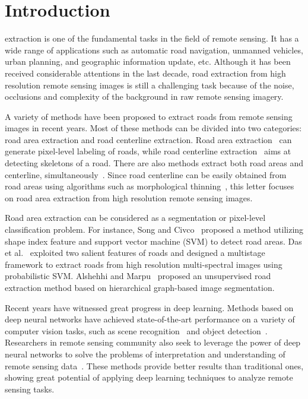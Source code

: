 \documentclass[journal]{IEEEtran}
\begin{document}
\section{Introduction}
 extraction is one of the fundamental tasks in the field of remote sensing. It has a wide range of applications such as automatic road navigation, unmanned vehicles, urban planning, and geographic information update, etc. Although it has been received considerable attentions in the last decade, road extraction from high resolution remote sensing images is still a challenging task because of the noise, occlusions and complexity of the background in raw remote sensing imagery.


A variety of methods have been proposed to extract roads from remote sensing images in recent years. Most of these methods can be divided into two categories: road area extraction and road centerline extraction. Road area  extraction~\cite{Xin2009Road,mnih2010learning,Unsalan2012Road,Cheng2015Urban,Saito2016Multiple,Alshehhi2017Hierarchical} can generate pixel-level labeling of roads, while road centerline extraction~\cite{Liu2015Main,Sujatha2015Connected} aims at detecting skeletons of a road. There are also methods extract both road areas and centerline, simultaneously~\cite{Cheng2017Automatic}. Since road centerline can be easily obtained from road areas using algorithms such as morphological thinning~\cite{Cheng2016Road}, this letter focuses on road area extraction from high resolution remote sensing images.

Road area extraction can be considered as a segmentation or pixel-level classification problem. For instance, Song and Civco~\cite{Song2004Road} proposed a method utilizing shape index feature and support vector machine (SVM) to detect road areas. Das et al.~\cite{Das2011Use} exploited two salient features of roads and designed a multistage framework to extract roads from high resolution multi-spectral images using probabilistic SVM. Alshehhi and Marpu~\cite{Alshehhi2017Hierarchical} proposed an unsupervised road extraction method based on hierarchical graph-based image segmentation.

Recent years have witnessed great progress in deep learning. Methods based on deep neural networks have achieved state-of-the-art performance on a variety of computer vision tasks, such as scene recognition~\cite{Zhou2014Learning} and object detection~\cite{Ren2017Faster}. Researchers in remote sensing community also seek to leverage the power of deep neural networks to solve the problems of interpretation and understanding of remote sensing data~\cite{mnih2010learning,mnih2012learning,zhang2016cnn,Saito2016Multiple,Zhang2016Deep,zhang2016functional}. These methods provide better results than traditional ones, showing great potential of applying deep learning techniques to analyze remote sensing tasks.
\end{document}
